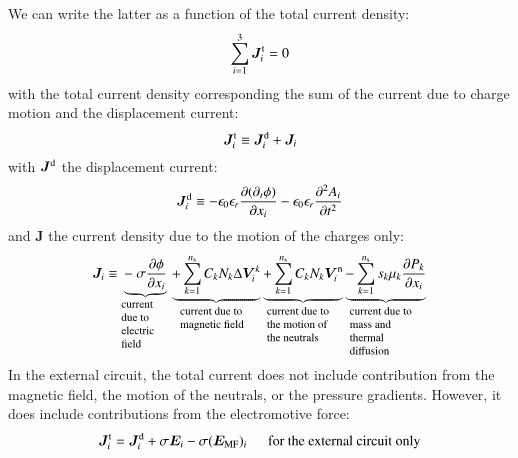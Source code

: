 \documentclass{warpdoc}
\newcommand{\ns}{{n_{\rm s}}}
\renewcommand{\vec}[1]{\bm{#1}}
\begin{document}
%
We can write the latter as a function of the total current density:
%
\begin{equation}
\sum_{i=1}^3 \vec{J}_i^{\rm t} =0
\end{equation}
%
with the total current density corresponding the sum of the current due to charge motion and the displacement current:
%
\begin{equation}
 \vec{J}_i^{\rm t} \equiv 
  \vec{J}_i^{\rm d}
+\vec{J}_i
\label{eqn:Jtotal}
\end{equation}
%
with $\vec{J}^{\rm d}$ the displacement current:
%
\begin{equation}
 \vec{J}_i^{\rm d} \equiv 
  -\epsilon_0 \epsilon_r \frac{\partial (\partial_t \phi)}{\partial x_i}
  -\epsilon_0 \epsilon_r \frac{\partial^2 A_i}{\partial t^2}
\label{eqn:Jdisplacement}
\end{equation}
%
and $\vec{J}$ the current density due to the motion of the charges only:
%
\begin{equation}
 \vec{J}_i \equiv 
  \underbrace{-~\sigma\frac{\partial \phi}{\partial x_i}}_{\begin{minipage}{0.1\textwidth}\footnotesize\flushleft current due to electric field \end{minipage}}
\underbrace{+ \sum_{k=1}^\ns C_k N_k \Delta \vec{V}^k_i}_{\begin{minipage}{0.15\textwidth}\footnotesize\flushleft current due to magnetic field \end{minipage}}
\underbrace{+ \sum_{k=1}^\ns C_k N_k \vec{V}^{\rm n}_i}_{\begin{minipage}{0.15\textwidth}\footnotesize\flushleft current due to the motion of the neutrals \end{minipage}}
\underbrace{- \sum_{k=1}^\ns {s_k \mu_k} \frac{\partial P_k}{\partial x_i} }_{\begin{minipage}{0.15\textwidth}\footnotesize\flushleft current due to mass and thermal diffusion \end{minipage}}
\label{eqn:Jcomponents}
\end{equation}
%
In the external circuit, the total current does not include contribution from the magnetic field, the motion of the neutrals, or the pressure gradients. However, it does include  contributions from the electromotive force:
%
\begin{equation}
 \vec{J}_i^{\rm t} =
  \vec{J}_i^{\rm d}
+ \sigma \vec{E}_i
- \sigma (\vec{E}_{\rm MF})_i ~~~~~~\textrm{for the external circuit only}
\end{equation}
%
\end{document}
